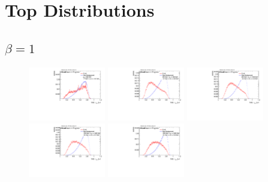 \section{Top Distributions}
\subsection*{$\beta=1$}
\vspace{-0.5cm}
\begin{figure}
\includegraphics[width=0.3\textwidth]{sascha_input/Appendix/Distributions/top/distributions/beta1/h_assisted_tj_nSub32_bin1.pdf} \hspace{1mm}
\includegraphics[width=0.3\textwidth]{sascha_input/Appendix/Distributions/top/distributions/beta1/h_assisted_tj_nSub32_bin2.pdf} \hspace{1mm}
\includegraphics[width=0.3\textwidth]{sascha_input/Appendix/Distributions/top/distributions/beta1/h_assisted_tj_nSub32_bin3.pdf} 
\bigskip
\includegraphics[width=0.3\textwidth]{sascha_input/Appendix/Distributions/top/distributions/beta1/h_assisted_tj_nSub32_bin4.pdf} \hspace{1mm}
\includegraphics[width=0.3\textwidth]{sascha_input/Appendix/Distributions/top/distributions/beta1/h_assisted_tj_nSub32_bin5.pdf} \hspace{1mm}

\end{figure}
